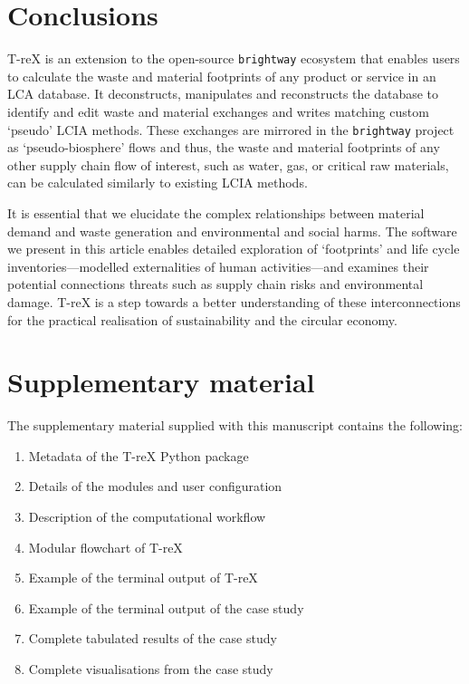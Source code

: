 \documentclass[a4paper,fleqn]{cas-dc}
\renewcommand{\texttt}[1]{{\ttfamily\small\nolinkurl{#1}}}
\begin{document}
\section{Conclusions}\label{sec:conclusions}

T-reX is an extension to the open-source \texttt{brightway} ecosystem that
enables users to calculate the waste and material footprints of any product or
service in an LCA database. It deconstructs, manipulates and reconstructs the
database to identify and edit waste and material exchanges and writes matching
custom `pseudo' LCIA methods. These exchanges are mirrored in the
\texttt{brightway} project as `pseudo-biosphere' flows and thus, the waste and
material footprints of any other supply chain flow of interest, such as water,
gas, or critical raw materials, can be calculated similarly to existing LCIA
methods.

It is essential that we elucidate the complex relationships between material
demand and waste generation and environmental and social harms. The software we
present in this article enables detailed exploration of `footprints' and life
cycle inventories---modelled externalities of human activities---and examines
their potential connections threats such as supply chain risks and
environmental damage. T-reX is a step towards a better understanding of these
interconnections for the practical realisation of sustainability and the
circular economy.

\section{Supplementary material}\label{sec:supplementary}
The supplementary material supplied with this manuscript contains the
following:
\begin{enumerate}
	\item Metadata of the T-reX Python package
	\item Details of the modules and user configuration
	\item Description of the computational workflow
	\item Modular flowchart of T-reX
	\item Example of the terminal output of T-reX
	\item Example of the terminal output of the case study
	\item Complete tabulated results of the case study
	\item Complete visualisations from the case study
\end{enumerate}
\end{document}
